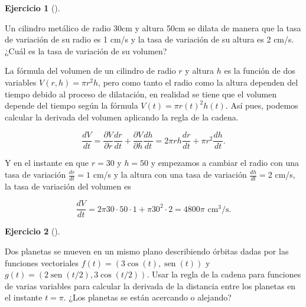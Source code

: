 \documentclass[
  spanish,
  a4paper,
]{scrreport}
\theoremstyle{definition}
\newtheorem{exercise}{Ejercicio}[chapter]
\theoremstyle{remark}
\begin{document}
\begin{exercise}[]\protect\hypertarget{exr-variacion-volumen-cilindro}{}\label{exr-variacion-volumen-cilindro}

Un cilindro metálico de radio 30cm y altura 50cm se dilata de manera que
la tasa de variación de su radio es 1 cm/s y la tasa de variación de su
altura es 2 cm/s. ¿Cuál es la tasa de variación de su volumen?

\end{exercise}

\begin{tcolorbox}[enhanced jigsaw, arc=.35mm, bottomrule=.15mm, bottomtitle=1mm, breakable, colback=white, colbacktitle=quarto-callout-tip-color!10!white, colframe=quarto-callout-tip-color-frame, coltitle=black, left=2mm, leftrule=.75mm, opacityback=0, opacitybacktitle=0.6, rightrule=.15mm, title=\textcolor{quarto-callout-tip-color}{\faLightbulb}\hspace{0.5em}{Solución}, titlerule=0mm, toprule=.15mm, toptitle=1mm]

La fórmula del volumen de un cilindro de radio \(r\) y altura \(h\) es
la función de dos variables \(V(r,h) = \pi r^2h\), pero como tanto el
radio como la altura dependen del tiempo debido al proceso de
dilatación, en realidad se tiene que el volumen depende del tiempo según
la fórmula \(V(t) = \pi r(t)^2 h(t)\). Así pues, podemos calcular la
derivada del volumen aplicando la regla de la cadena.

\[
\frac{dV}{dt}
= \frac{\partial V}{\partial r}\frac{dr}{dt} + \frac{\partial V}{\partial h}\frac{dh}{dt}
= 2\pi rh \frac{dr}{dt} + \pi r^2 \frac{dh}{dt}.
\]

Y en el instante en que \(r=30\) y \(h=50\) y empezamos a cambiar el
radio con una tasa de variación \(\frac{dr}{dt}=1\) cm/s y la altura con
una tasa de variación \(\frac{dh}{dt}=2\) cm/s, la tasa de variación del
volumen es

\[
\frac{dV}{dt}
= 2\pi 30\cdot 50\cdot 1 + \pi 30^2 \cdot 2 
= 4800 \pi \mbox{ cm$^3$/s}.
\]

\end{tcolorbox}

\begin{exercise}[]\protect\hypertarget{exr-distancia-planetas}{}\label{exr-distancia-planetas}

Dos planetas se mueven en un mismo plano describiendo órbitas dadas por
las funciones vectoriales \(f(t) = (3 \cos(t), \operatorname{sen}(t))\)
y \(g(t) = (2\operatorname{sen}(t/2), 3\cos(t/2))\). Usar la regla de la
cadena para funciones de varias variables para calcular la derivada de
la distancia entre los planetas en el instante \(t=\pi\). ¿Los planetas
se están acercando o alejando?

\end{exercise}
\end{document}
